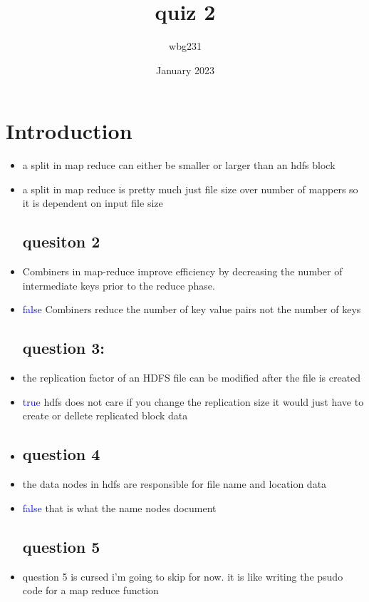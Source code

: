 \documentclass{article}
\title{quiz 2 }
\author{wbg231 }
\date{January 2023}
\begin{document}
\maketitle

\section{Introduction}
\begin{itemize}
\subsection*{question 1 }
    \item a split in map reduce can either be smaller or larger than an hdfs block 
    \item a split in map reduce is pretty much just file size over number of mappers so it is dependent on input file size
    \subsection*{quesiton 2}
    \item Combiners in map-reduce improve efficiency by decreasing the number of intermediate keys prior to the reduce phase.
    \item \textcolor{blue}{false} Combiners reduce the number of key value pairs not the number of keys 
    \subsection*{question 3:}
    \item the replication factor of an HDFS file can be modified after the file is created
    \item \textcolor{blue}{true} hdfs does not care if you change the replication size it would just have to create or dellete replicated block data 
    \item  
    \subsection*{question 4 }
    \item the data nodes in hdfs are responsible for file name and location data
    \item \textcolor{blue}{false} that is what the name nodes document
    \subsection*{question 5 }
    \item question 5 is cursed i'm going to skip for now. it is like writing  the psudo code for a map reduce function 
\end{itemize}
\end{document}
